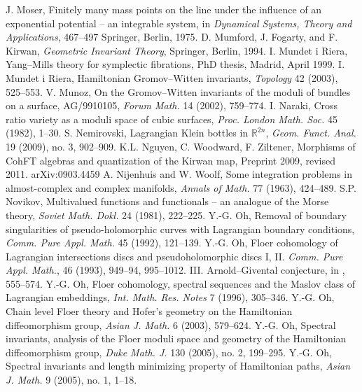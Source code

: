
 J. Moser, Finitely many mass points on the line under the influence of an exponential potential -- an integrable system, in \emph{Dynamical Systems, Theory and Applications}, 467--497 Springer, Berlin, 1975.
 D. Mumford, J. Fogarty, and F. Kirwan, \emph{Geometric Invariant Theory}, Springer, Berlin, 1994.
 I. Mundet i Riera, Yang--Mills theory for symplectic fibrations, PhD thesis, Madrid, April 1999.
 I. Mundet i Riera, Hamiltonian Gromov--Witten invariants, \emph{Topology} 42 (2003), 525--553.
 V. Munoz, On the Gromov--Witten invariants of the moduli of bundles on a surface, AG/9910105, \emph{Forum Math.} 14 (2002), 759--774.
 I. Naraki, Cross ratio variety as a moduli space of cubic surfaces, \emph{Proc. London Math. Soc.} 45 (1982), 1--30.
 S. Nemirovski, Lagrangian Klein bottles in $\mathbb R^{2n}$, \emph{Geom. Funct. Anal.} 19 (2009), no. 3, 902--909.
 K.L. Nguyen, C. Woodward, F. Ziltener, Morphisms of CohFT algebras and quantization of the Kirwan map, Preprint 2009, revised 2011. arXiv:0903.4459
 A. Nijenhuis and W. Woolf, Some integration problems in almost-complex and complex manifolds, \emph{Annals of Math.} 77 (1963), 424--489.
 S.P. Novikov, Multivalued functions and functionals -- an analogue of the Morse theory, \emph{Soviet Math. Dokl.} 24 (1981), 222--225.
 Y.-G. Oh, Removal of boundary singularities of pseudo-holomorphic curves with Lagrangian boundary conditions, \emph{Comm. Pure Appl. Math.} 45 (1992), 121--139.
 Y.-G. Oh, Floer cohomology of Lagrangian intersections discs and pseudoholomorphic discs I, II. \emph{Comm. Pure Appl. Math.}, 46 (1993), 949--94, 995--1012. III. Arnold--Givental conjecture, in \cite{src-181}, 555--574.
 Y.-G. Oh, Floer cohomology, spectral sequences and the Maslov class of Lagrangian embeddings, \emph{Int. Math. Res. Notes} 7 (1996), 305--346.
 Y.-G. Oh, Chain level Floer theory and Hofer’s geometry on the Hamiltonian diffeomorphism group, \emph{Asian J. Math.} 6 (2003), 579--624.
 Y.-G. Oh, Spectral invariants, analysis of the Floer moduli space and geometry of the Hamiltonian diffeomorphism group, \emph{Duke Math. J.} 130 (2005), no. 2, 199--295.
 Y.-G. Oh, Spectral invariants and length minimizing property of Hamiltonian paths, \emph{Asian J. Math.} 9 (2005), no. 1, 1--18.
